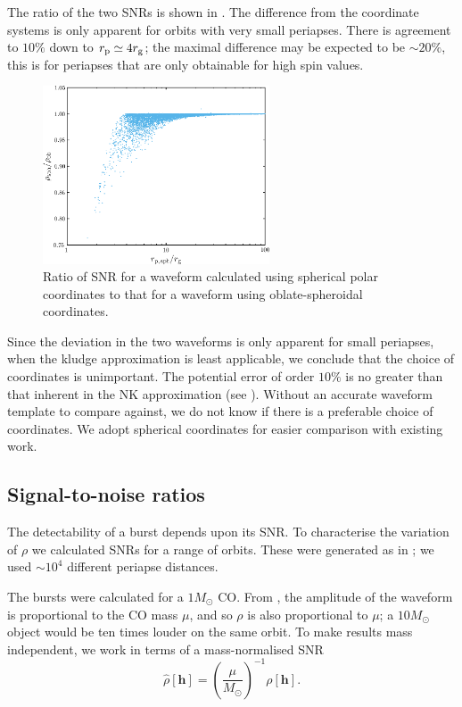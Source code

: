 The ratio of the two SNRs is shown in . 
The difference from the coordinate systems is only apparent for orbits with very small periapses. There is agreement to $10\%$ down to $r_\mathrm{p} \simeq 4 r_\mathrm{g}$; the maximal difference may be expected to be $\sim 20\%$, this is for periapses that are only obtainable for high spin values.
\begin{figure}
\centering
 \includegraphics[width=0.6\textwidth]{./images/Fig_SNR_ratio}
 \caption{Ratio of SNR for a waveform calculated using spherical polar coordinates to that for a waveform using oblate-spheroidal coordinates.}
   \label{fig:Oblate_sphere}
\end{figure}

Since the deviation in the two waveforms is only apparent for small periapses, when the kludge approximation is least applicable, we conclude that the choice of coordinates is unimportant. The potential error of order $10\%$ is no greater than that inherent in the NK approximation (see ). Without an accurate waveform template to compare against, we do not know if there is a preferable choice of coordinates. We adopt spherical coordinates for easier comparison with existing work.

\subsection{Signal-to-noise ratios}\label{sec:Gal-SNR}

The detectability of a burst depends upon its SNR. To characterise the variation of $\rho$ we calculated SNRs for a range of orbits. These were generated as in ; we used $\sim 10^4$ different periapse distances.

The bursts were calculated for a $1 M_\odot$ CO. From , the amplitude of the waveform is proportional to the CO mass $\mu$, and so $\rho$ is also proportional to $\mu$; a $10 M_\odot$ object would be ten times louder on the same orbit. To make results mass independent, we work in terms of a mass-normalised SNR
\begin{equation}
\hat{\rho}[\boldsymbol{h}] = \left(\dfrac{\mu}{M_\odot}\right)^{-1}\rho[\boldsymbol{h}].
\end{equation}

